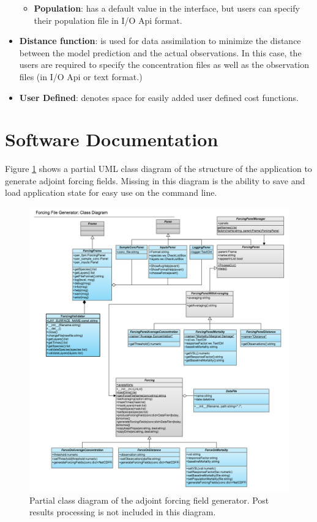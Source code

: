 \documentclass{article}
\begin{document}
\begin{itemize}
\begin{itemize}
	  \item \textbf{Population}: has a default value in the interface, but users can specify their population file in I/O Api format.
	\end{itemize}
	\item \textbf{Distance function}: is used for data assimilation to minimize the distance between the model prediction and the actual observations. In this case, the users are required to specify the concentration files as well as the observation files (in I/O Api or text format.)
	\item \textbf{User Defined}: denotes space for easily added user defined cost functions.
\end{itemize}


\clearpage
\section{Software Documentation}

Figure \ref{classdia} shows a partial UML class diagram of the structure of the application to generate adjoint forcing fields.  Missing in this diagram is the ability to save and load application state for easy use on the command line.

\begin{figure}
	\centering
	\includegraphics[width=1.2\textwidth]{Forcing_Generator.png}
	\caption{Partial class diagram of the adjoint forcing field generator.  Post results processing is not included in this diagram.}
	\label{classdia}
\end{figure}
\end{document}
